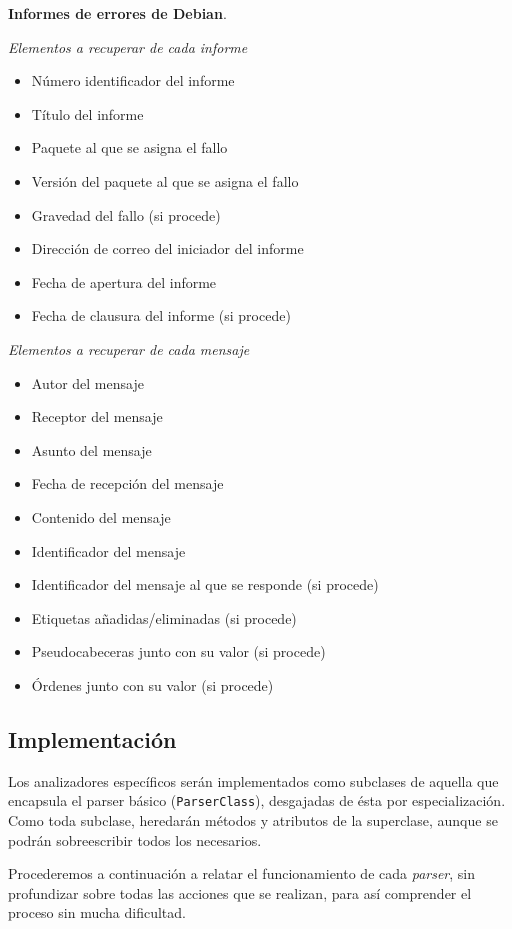 \noindent \textbf{Informes de errores de Debian}.

\noindent \textit{Elementos a recuperar de cada informe}
\begin{itemize} \itemsep=-0.1cm
\item Número identificador del informe
\item Título del informe
\item Paquete al que se asigna el fallo
\item Versión del paquete al que se asigna el fallo
\item Gravedad del fallo (si procede)
\item Dirección de correo del iniciador del informe
\item Fecha de apertura del informe
\item Fecha de clausura del informe (si procede)
\end{itemize}

\noindent \textit{Elementos a recuperar de cada mensaje}
\begin{itemize} \itemsep=-0.1cm
\item Autor del mensaje
\item Receptor del mensaje
\item Asunto del mensaje
\item Fecha de recepción del mensaje
\item Contenido del mensaje
\item Identificador del mensaje
\item Identificador del mensaje al que se responde (si procede)
\item Etiquetas añadidas/eliminadas (si procede)
\item Pseudocabeceras junto con su valor (si procede)
\item Órdenes junto con su valor (si procede)
\end{itemize}


\subsection{Implementación}
Los analizadores específicos serán implementados como subclases de aquella
que encapsula el parser básico (\texttt{ParserClass}), desgajadas de ésta por
especialización. Como toda subclase, heredarán métodos y atributos de la
superclase, aunque se podrán sobreescribir todos los necesarios.

Procederemos a continuación a relatar el funcionamiento de cada \textit{parser},
sin profundizar sobre todas las acciones que se realizan, para así comprender
el proceso sin mucha dificultad.\\

